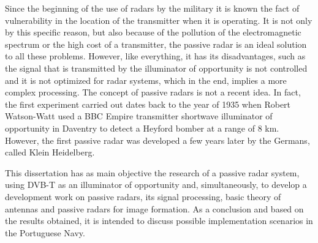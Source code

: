 \begin{abstractotherlanguage}



Since the beginning of the use of radars by the military it is known the fact of vulnerability in the location of the transmitter when it is operating. It is not only by this specific reason, but also because of the pollution of the electromagnetic spectrum or the high cost of a transmitter, the passive radar is an ideal solution to all these problems. However, like everything, it has its disadvantages, such as the signal that is transmitted by the illuminator of opportunity is not controlled and it is not optimized for radar systems, which in the end, implies a more complex processing.
The concept of passive radars is not a recent idea. In fact, the first experiment carried out dates back to the year of 1935 when Robert Watson-Watt used a BBC Empire transmitter shortwave illuminator of opportunity in Daventry to detect a Heyford bomber at a range of 8 km. However, the first passive radar was developed a few years later by the Germans, called Klein Heidelberg.\par 
This dissertation has as main objective the research of a passive radar system, using \gls{DVB-T} as an illuminator of opportunity and, simultaneously, to develop a development work on passive radars, its signal processing, basic theory of antennas and passive radars for image formation. As a conclusion and based on the results obtained, it is intended to discuss possible implementation scenarios in the Portuguese Navy.


\end{abstractotherlanguage}




\tableofcontents %

